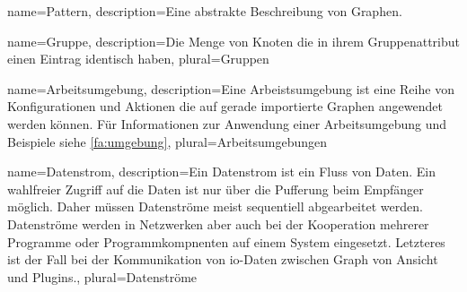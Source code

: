 {
  name=Pattern,
  description={Eine abstrakte Beschreibung von Graphen.}
}

{
  name=Gruppe,
  description={Die Menge von Knoten die in ihrem Gruppenattribut einen Eintrag identisch haben},
  plural=Gruppen
}

 {
   name=Arbeitsumgebung,
   description={Eine Arbeistsumgebung ist eine Reihe von Konfigurationen und Aktionen die auf gerade importierte Graphen angewendet werden können.
     Für Informationen zur Anwendung einer Arbeitsumgebung und Beispiele siehe \ref{fa:umgebung}},
   plural=Arbeitsumgebungen
 }
 
 {
   name=Datenstrom,
   description={Ein Datenstrom ist ein Fluss von Daten. Ein wahlfreier Zugriff auf die Daten ist nur über die Pufferung beim Empfänger möglich. Daher müssen Datenströme meist sequentiell abgearbeitet werden. Datenströme werden in Netzwerken aber auch bei der Kooperation mehrerer Programme oder Programmkompnenten auf einem System eingesetzt. Letzteres ist der Fall bei der Kommunikation von \gls{io}-Daten zwischen Graph von Ansicht und Plugins.},
   plural=Datenströme
 }



